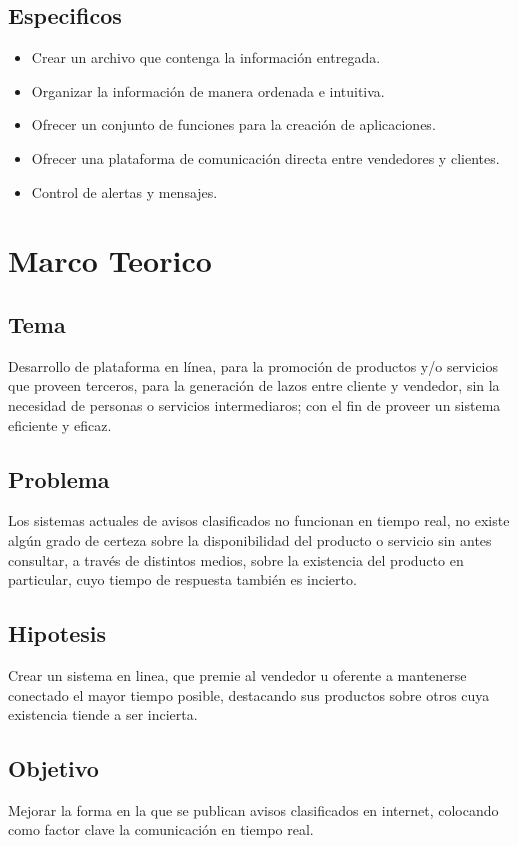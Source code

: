 \documentclass[letterpaper,openright,10pt,oneside]{report}
\begin{document}
		\section{Especificos}
			\begin{itemize}
				\item Crear un archivo que contenga la información entregada.
				\item Organizar la información de manera ordenada e intuitiva.
				\item Ofrecer un conjunto de funciones para la creación de aplicaciones.
				\item Ofrecer una plataforma de comunicación directa entre vendedores y clientes.
				\item Control de alertas y mensajes.
			\end{itemize}
	\chapter{Marco Teorico}
		\section{Tema}
			Desarrollo de plataforma en línea, para la promoción de productos y/o servicios que proveen terceros, para la generación de lazos entre cliente y vendedor, sin la necesidad de personas o servicios intermediaros; con el fin de proveer un sistema eficiente y eficaz.
		\section{Problema}
			Los sistemas actuales de avisos clasificados no funcionan en tiempo real, no existe algún grado de certeza sobre la disponibilidad del producto o servicio sin antes consultar, a través de distintos medios, sobre la existencia del producto en particular, cuyo tiempo de respuesta también es incierto.
		\section{Hipotesis}
			Crear un sistema en linea, que premie al vendedor u oferente a mantenerse conectado el mayor tiempo posible, destacando sus productos sobre otros cuya existencia tiende a ser incierta.
		\section{Objetivo}
			Mejorar la forma en la que se publican avisos clasificados en internet, colocando como factor clave la comunicación en tiempo real.
\end{document}
